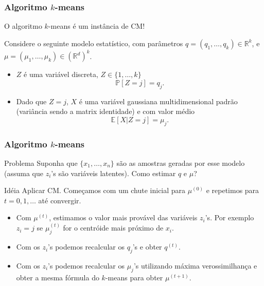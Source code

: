 \documentclass{beamer}
\newcommand{\R}{\mathbb{R}}
\newcommand{\Prob}{\mathbb{P}}
\newcommand{\E}{\mathbb{E}}
\begin{document}
\begin{frame}

	\frametitle{Algoritmo $k$-means}
	
	O algoritmo $k$-means é um instância de CM!

	\bigskip
	\pause
	Considere o seguinte modelo estatístico, com parâmetros
	$q=(q_1,\ldots, q_k)\in \R^k$, e $\mu=(\mu_1,\ldots,\mu_k)
	\in (\R^d)^k$.\pause
	\begin{itemize}
		\item $Z$ é uma variável discreta, $Z\in \{1,\ldots, k\}$
		\[
		\Prob[Z=j] = q_j.
		\]
		\pause
		\item Dado que $Z=j$, $X$ é uma variável gaussiana multidimensional
		padrão (variância sendo a matrix identidade) e com valor médio
		\[
		  \E[X|Z=j] = \mu_j.
		\]
	\end{itemize}
\end{frame}

\begin{frame}
	
	\frametitle{Algoritmo $k$-means}
	\begin{block}{Problema}
		Suponha que $\{x_1,\ldots, x_n\}$ são as amostras geradas por
		esse modelo (assuma que $z_i$'s são variáveis latentes). Como
		estimar $q$ e $\mu$?
	\end{block}
	\pause
	\begin{alertblock}{Idéia}
		Aplicar CM. Começamos com um chute inicial para $\mu^{(0)}$ e
		repetimos para $t=0,1,\ldots$ até convergir.
		\pause
		\begin{itemize}
			\item Com $\mu^{(t)}$, estimamos o valor mais provável das variáveis
			$z_i$'s. \pause Por exemplo $z_i=j$ se $\mu^{(t)}_j$ for o
			centróide mais próximo de $x_i$. \pause
			\item Com os $z_i$'s podemos recalcular os $q_j$'s e obter
			$q^{(t)}$. \pause
			\item Com os $z_i$'s podemos recalcular os $\mu_j$'s utilizando
			máxima verossimilhança e obter a mesma fórmula do $k$-means
			para obter $\mu^{(t+1)}$.
		\end{itemize}
	\end{alertblock}

\end{frame}
\end{document}
